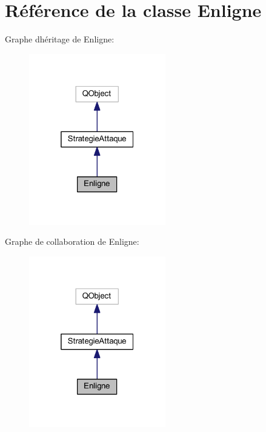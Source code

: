 \hypertarget{class_enligne}{}\section{Référence de la classe Enligne}
\label{class_enligne}


Graphe d\textquotesingle{}héritage de Enligne\+:
\nopagebreak
\begin{figure}[H]
\begin{center}
\leavevmode
\includegraphics[width=169pt]{class_enligne__inherit__graph}
\end{center}
\end{figure}


Graphe de collaboration de Enligne\+:
\nopagebreak
\begin{figure}[H]
\begin{center}
\leavevmode
\includegraphics[width=169pt]{class_enligne__coll__graph}
\end{center}
\end{figure}
